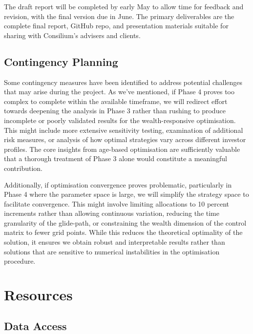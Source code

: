 \documentclass[11pt]{article}
\begin{document}
The draft report will be completed by early May to allow time for feedback and revision, with the final version due in June. The primary deliverables are the complete final report, GitHub repo, and presentation materials suitable for sharing with Consilium's advisers and clients.


\subsection{Contingency Planning}

Some contingency measures have been identified to address potential challenges that may arise during the project. As we've mentioned, if Phase 4 proves too complex to complete within the available timeframe, we will redirect effort towards deepening the analysis in Phase 3 rather than rushing to produce incomplete or poorly validated results for the wealth-responsive optimisation. This might include more extensive sensitivity testing, examination of additional risk measures, or analysis of how optimal strategies vary across different investor profiles. The core insights from age-based optimisation are sufficiently valuable that a thorough treatment of Phase 3 alone would constitute a meaningful contribution.

Additionally, if optimisation convergence proves problematic, particularly in Phase 4 where the parameter space is large, we will simplify the strategy space to facilitate convergence. This might involve limiting allocations to 10 percent increments rather than allowing continuous variation, reducing the time granularity of the glide-path, or constraining the wealth dimension of the control matrix to fewer grid points. While this reduces the theoretical optimality of the solution, it ensures we obtain robust and interpretable results rather than solutions that are sensitive to numerical instabilities in the optimisation procedure.


\section{Resources}

\subsection{Data Access}
\end{document}
